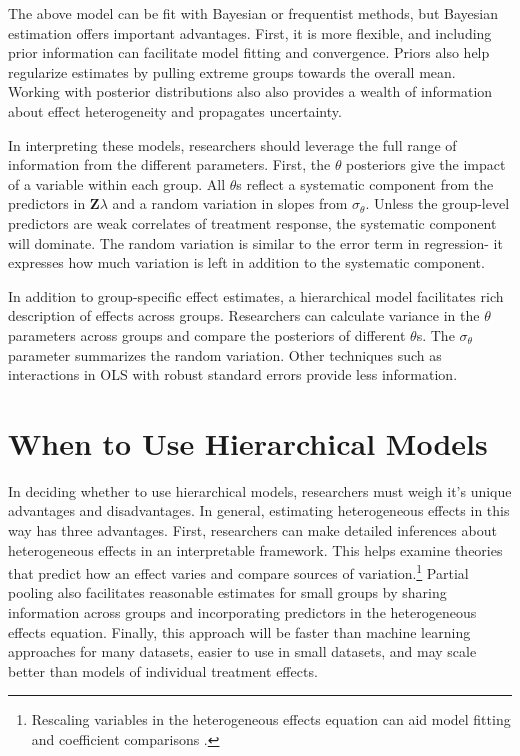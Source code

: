\documentclass[12pt]{article}
\begin{document}
The above model can be fit with Bayesian or frequentist methods, but Bayesian estimation offers important advantages.
First, it is more flexible, and including prior information can facilitate model fitting and convergence. 
Priors also help regularize estimates by pulling extreme groups towards the overall mean.
Working with posterior distributions also also provides a wealth of information about effect heterogeneity and propagates uncertainty.  


In interpreting these models, researchers should leverage the full range of information from the different parameters. 
First, the $\theta$ posteriors give the impact of a variable within each group.
All $\theta$s reflect a systematic component from the predictors in \textbf{Z}$\lambda$ and a random variation in slopes from $\sigma_\theta$. 
Unless the group-level predictors are weak correlates of treatment response, the systematic component will dominate. 
The random variation is similar to the error term in regression- it expresses how much variation is left in addition to the systematic component. 


In addition to group-specific effect estimates, a hierarchical model facilitates rich description of effects across groups. 
Researchers can calculate variance in the $\theta$ parameters across groups and compare the posteriors of different $\theta$s. 
The $\sigma_\theta$ parameter summarizes the random variation. 
Other techniques such as interactions in OLS with robust standard errors provide less information.


\section{When to Use Hierarchical Models}

In deciding whether to use hierarchical models, researchers must weigh it's unique advantages and disadvantages. 
In general, estimating heterogeneous effects in this way has three advantages.
First, researchers can make detailed inferences about heterogeneous effects in an interpretable framework. 
This helps examine theories that predict how an effect varies and compare sources of variation.\footnote{Rescaling variables in the heterogeneous effects equation can aid model fitting and coefficient comparisons \citep{Gelman2008}.} 
Partial pooling also facilitates reasonable estimates for small groups by sharing information across groups and incorporating predictors in the heterogeneous effects equation. 
Finally, this approach will be faster than machine learning approaches for many datasets, easier to use in small datasets, and may scale better than models of individual treatment effects.
\end{document}
